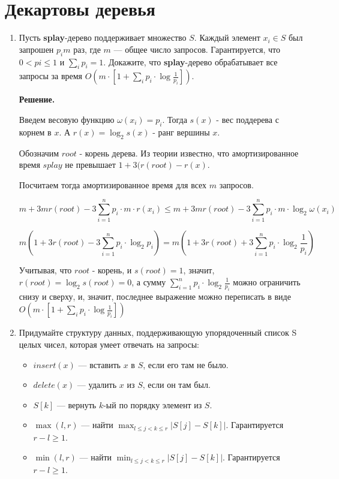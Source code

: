 \section*{Декартовы деревья}
\begin{enumerate}
	\item Пусть \textbf{splay}-дерево поддерживает множество $S$. Каждый элемент $x_i \in S$ был запрошен $p_im$ раз, где $m$ — общее число запросов. 
	Гарантируется, что $0 < pi \leqslant 1$ и $\sum_ip_i = 1$. Докажите, что \textbf{splay}-дерево обрабатывает все запросы за время $O(m\cdot \left[1 + \sum_ip_i\cdot \log \frac{1}{p_i} \right])$.

	\textbf{Решение.} 
	
	Введем весовую функцию $\omega(x_i) = p_i$. Тогда $s(x)$ - вес поддерева с корнем в $x$. А $r(x) = \log_2 s(x)$ - ранг вершины $x$.
	
	Обозначим $root$ - корень дерева. Из теории известно, что амортизированное время $splay$ не превышает $1 + 3(r(root) - r(x)$.
	
	Посчитаем тогда амортизированное время для всех $m$ запросов. 
	
	$$m + 3mr(root) - 3\sum\limits_{i = 1}^{n} p_i\cdot m\cdot r(x_i) \leqslant m + 3mr(root) - 3\sum\limits_{i = 1}^{n} p_i\cdot m\cdot \log_2 \omega(x_i)$$
	
	$$m(1 + 3 r(root) - 3 \sum\limits_{i = 1}^{n} p_i\cdot \log_2 p_i) = 
	m(1 + 3 r(root) + 3 \sum\limits_{i = 1}^{n} p_i\cdot \log_2 \frac{1}{p_i})$$
	
	Учитывая, что $root$ - корень, и $s(root) = 1$, значит, $r(root) = \log_2 s(root) = 0$, а сумму $\sum\limits_{i = 1}^{n} p_i\cdot \log_2 \frac{1}{p_i}$ можно ограничить снизу и сверху, и, значит, последнее выражение можно переписать в виде $O(m\cdot \left[1 + \sum_ip_i\cdot \log \frac{1}{p_i} \right])$
	
	\item Придумайте структуру данных, поддерживающую упорядоченный список S целых чисел, которая
	умеет отвечать на запросы:
	\begin{itemize}
		\item $insert(x)$ — вставить $x$ в $S$, если его там не было.
		\item $delete(x)$ — удалить $x$ из $S$, если он там был.
		\item $S[k]$ — вернуть $k$-ый по порядку элемент из $S$.
		\item $\max(l, r)$ — найти $\max_{l\leqslant j<k\leqslant r} |S[j] - S[k]|$. Гарантируется $r - l \geqslant 1$.
		\item $\min(l, r)$ — найти $\min_{l\leqslant j<k\leqslant r} |S[j] - S[k]|$. Гарантируется $r - l \geqslant 1$.
	\end{itemize}
	

\end{enumerate}
